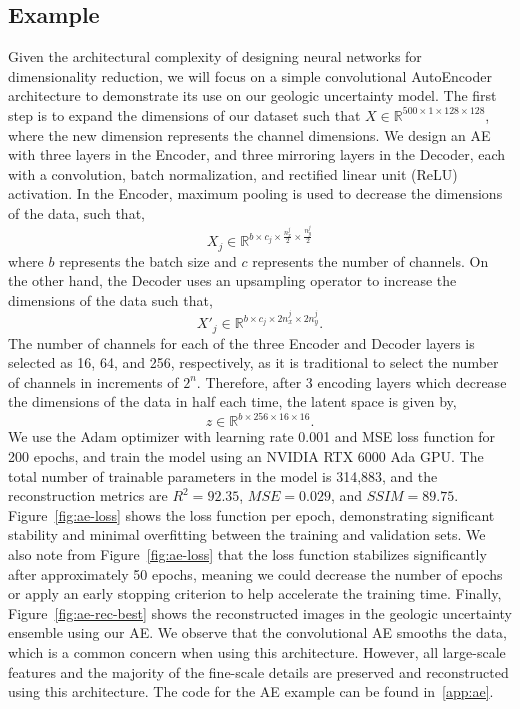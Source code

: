 \documentclass[a4paper,fleqn,12pt]{article}
\begin{document}
\subsection*{Example}
Given the architectural complexity of designing neural networks for dimensionality reduction, we will focus on a simple convolutional AutoEncoder architecture to demonstrate its use on our geologic uncertainty model. The first step is to expand the dimensions of our dataset such that $X\in\mathbb{R}^{500\times1\times128\times128}$, where the new dimension represents the channel dimensions. We design an AE with three layers in the Encoder, and three mirroring layers in the Decoder, each with a convolution, batch normalization, and rectified linear unit (ReLU) activation. In the Encoder, maximum pooling is used to decrease the dimensions of the data, such that,
\begin{equation}
    X_{j}\in\mathbb{R}^{b\times c_j \times \frac{n_x^j}{2} \times \frac{n_y^j}{2}}    
\end{equation}
where $b$ represents the batch size and $c$ represents the number of channels. On the other hand, the Decoder uses an upsampling operator to increase the dimensions of the data such that,
\begin{equation}
    X'_j\in\mathbb{R}^{b \times c_j \times 2n_x^j \times 2n_y^j} .
\end{equation}
The number of channels for each of the three Encoder and Decoder layers is selected as 16, 64, and 256, respectively, as it is traditional to select the number of channels in increments of $2^n$. Therefore, after 3 encoding layers which decrease the dimensions of the data in half each time, the latent space is given by,
\begin{equation}
    z\in\mathbb{R}^{b\times 256\times16\times16} .    
\end{equation}
We use the Adam optimizer \cite{kingma2014adam} with learning rate 0.001 and MSE loss function for 200 epochs, and train the model using an NVIDIA RTX 6000 Ada GPU. The total number of trainable parameters in the model is 314,883, and the reconstruction metrics are $R^2=92.35$, $MSE=0.029$, and $SSIM=89.75$. Figure~\ref{fig:ae-loss} shows the loss function per epoch, demonstrating significant stability and minimal overfitting between the training and validation sets. We also note from Figure~\ref{fig:ae-loss} that the loss function stabilizes significantly after approximately 50 epochs, meaning we could decrease the number of epochs or apply an early stopping criterion to help accelerate the training time. Finally, Figure~\ref{fig:ae-rec-best} shows the reconstructed images in the geologic uncertainty ensemble using our AE. We observe that the convolutional AE smooths the data, which is a common concern when using this architecture. However, all large-scale features and the majority of the fine-scale details are preserved and reconstructed using this architecture. The code for the AE example can be found in~\ref{app:ae}.
\end{document}
